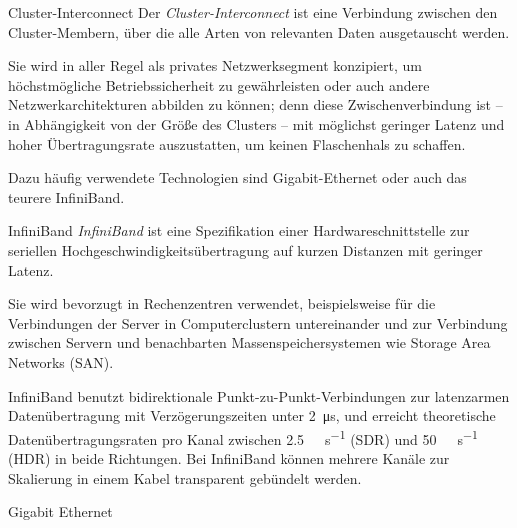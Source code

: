 \begin{defi}{Cluster-Interconnect}
    Der \emph{Cluster-Interconnect} ist eine Verbindung zwischen den Cluster-Membern, über die alle Arten von relevanten Daten ausgetauscht werden.

    Sie wird in aller Regel als privates Netzwerksegment konzipiert, um höchstmögliche Betriebssicherheit zu gewährleisten oder auch andere Netzwerkarchitekturen abbilden zu können;
    denn diese Zwischenverbindung ist -- in Abhängigkeit von der Größe des Clusters -- mit möglichst geringer Latenz und hoher Übertragungsrate auszustatten, um keinen Flaschenhals zu schaffen.

    Dazu häufig verwendete Technologien sind Gigabit-Ethernet oder auch das teurere InfiniBand.
\end{defi}

\begin{defi}{InfiniBand}
    \emph{InfiniBand} ist eine Spezifikation einer Hardwareschnittstelle zur seriellen Hochgeschwindigkeitsübertragung auf kurzen Distanzen mit geringer Latenz.

    Sie wird bevorzugt in Rechenzentren verwendet, beispielsweise für die Verbindungen der Server in Computerclustern untereinander und zur Verbindung zwischen Servern und benachbarten Massenspeichersystemen wie Storage Area Networks (SAN).

    InfiniBand benutzt bidirektionale Punkt-zu-Punkt-Verbindungen zur latenzarmen Datenübertragung mit Verzögerungszeiten unter \SI{2}{\micro\second}, und erreicht theoretische Datenübertragungsraten pro Kanal zwischen \SI{2,5}{\giga\bit\per\second} (SDR) und \SI{50}{\giga\bit\per\second} (HDR) in beide Richtungen.
    Bei InfiniBand können mehrere Kanäle zur Skalierung in einem Kabel transparent gebündelt werden.
\end{defi}

\begin{defi}{Gigabit Ethernet}

\end{defi}